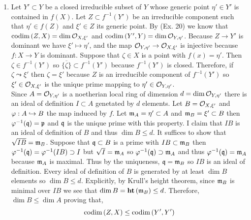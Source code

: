 \documentclass[12pt]{article}
\begin{document}
\begin{enumerate}
\item Let $Y' \subset Y$ be a closed irreducible subset of $Y$ whose generic point $\eta' \in Y'$ is contained in $f(X)$. Let $Z \subset f^{-1}(Y')$ be an irreducible component such that $\eta' \in f(Z)$ and $\xi' \in Z$ its generic point. By (Ex. 20) we know that $\mathrm{codim}\left( Z,X \right) = \dim \mathcal{O}_{X, \xi'}$ and $\mathrm{codim}\left( Y',Y \right) = \dim \mathcal{O}_{Y, \eta'}$. Because $Z \to Y'$ is dominant we have $\xi' \mapsto \eta'$, and the map $\mathcal{O}_{Y, \eta'} \to \mathcal{O}_{X, \xi'}$ is injective because $f : X \to Y$ is dominant. Suppose that $\zeta \in X$ is a point with $f(x) = \eta'$. Then $\zeta \in f^{-1}(Y')$ so $\overline{ \{ \zeta \} } \subset f^{-1}(Y')$ because $f^{-1}(Y')$ is closed. Therefore, if $\zeta \leadsto \xi'$ then $\zeta = \xi'$ because $Z$ is an irreducible component of $f^{-1}(Y')$ so $\xi' \in \mathcal{O}_{X, \xi'}$ is the unique prime mapping to $\eta' \in \mathcal{O}_{Y, \eta'}$. 
\bigskip\\
Since $A = \mathcal{O}_{Y, \eta'}$ is a noetherian local ring of dimension $d = \dim \mathcal{O}_{Y, \eta'}$ there is an ideal of definition $I \subset A$ genetated by $d$ elements. Let $B = \mathcal{O}_{X, \xi'}$ and $\varphi : A \hookrightarrow B$ the map induced by $f$. Let $\mathfrak{m}_A = \eta' \subset A$ and $\mathfrak{m}_B = \xi' \subset B$ then $\varphi^{-1}(\mathfrak{q}) = \mathfrak{p}$ and $\mathfrak{q}$ is the unique prime with this property. I claim that $I B$ is an ideal of definition of $B$ and thus $\dim{B} \le d$. It suffices to show that $\sqrt{IB} = \mathfrak{m}_B$. Suppose that $\mathfrak{q} \subset B$ is a prime with $IB \subset \mathfrak{m}_B$ then $\varphi^{-1}(\mathfrak{q}) = \varphi^{-1}(IB) \supset I$ but $\sqrt{I} = \mathfrak{m}_A$ so $\varphi^{-1}(\mathfrak{q}) \supset \mathfrak{m}_A$ and thus $\varphi^{-1}(\mathfrak{q}) = \mathfrak{m}_A$ because $\mathfrak{m}_A$ is maximal. Thus by the uniqueness, $\mathfrak{q} = \mathfrak{m}_B$ so $IB$ is an ideal of definition. Every ideal of definition of $B$ is generated by at least $\dim{B}$ elements so $\dim{B} \le d$. Explicitly, by Krull's height theorem, since $\mathfrak{m}_B$ is minimal over $IB$ we see that $\dim{B} = \mathbf{ht}\left( \mathfrak{m}_B \right) \le d$. Therefore, $\dim{B} \le \dim{A}$ proving that,
\[ \mathrm{codim}\left( Z,X \right) \le \mathrm{codim}\left( Y',Y' \right) \]



\end{enumerate}
\end{document}
